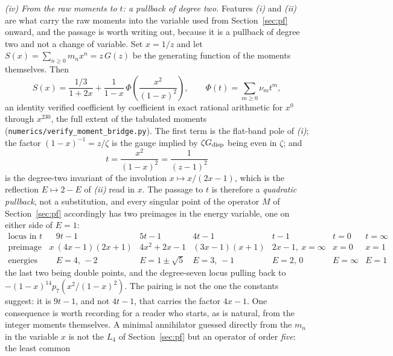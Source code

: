\documentclass[11pt]{article}
\theoremstyle{plain}
\theoremstyle{remark}
\begin{document}
\emph{(iv) From the raw moments to $t$: a pullback of degree two.} Features \emph{(i)} and \emph{(ii)} are what
carry the raw moments into the variable used from Section~\ref{sec:pf} onward, and the passage is worth writing
out, because it is a pullback of degree two and not a change of variable. Set $x=1/z$ and let
$S(x)=\sum_{n\ge0}m_nx^n=z\,G(z)$ be the generating function of the moments themselves. Then
\begin{equation}
S(x)=\frac{1/3}{1+2x}+\frac{1}{1-x}\,\Phi\!\left(\frac{x^{2}}{(1-x)^{2}}\right),
\qquad \Phi(t)=\sum_{m\ge0}\nu_m t^m,
\label{eq:momentbridge}
\end{equation}
an identity verified coefficient by coefficient in exact rational arithmetic for $x^{0}$ through $x^{230}$, the
full extent of the tabulated moments (\texttt{numerics/verify\_moment\_bridge.py}). The first term is the
flat-band pole of \emph{(i)}; the factor $(1-x)^{-1}=z/\zeta$ is the gauge implied by $\zeta G_{\rm disp}$ being
even in $\zeta$; and
\begin{equation}
t=\frac{x^{2}}{(1-x)^{2}}=\frac{1}{(z-1)^{2}}
\label{eq:tofx}
\end{equation}
is the degree-two invariant of the involution $x\mapsto x/(2x-1)$, which is the reflection $E\mapsto2-E$ of
\emph{(ii)} read in $x$. The passage to $t$ is therefore a \emph{quadratic pullback}, not a substitution, and
every singular point of the operator $M$ of Section~\ref{sec:pf} accordingly has two preimages in the energy
variable, one on either side of $E=1$:
{\small\setlength{\arraycolsep}{3pt}%
\begin{equation}
\begin{array}{c|cccccc}
\text{locus in }t & 9t-1 & 5t-1 & 4t-1 & t-1 & t=0 & t=\infty\\\hline
\text{preimage in }x & (4x-1)(2x+1) & 4x^{2}+2x-1 & (3x-1)(x+1) & 2x-1,\ x=\infty & x=0 & x=1\\
\text{energies} & E=4,\,-2 & E=1\pm\sqrt5 & E=3,\,-1 & E=2,\,0 & E=\infty & E=1
\end{array}
\label{eq:branches}
\end{equation}}%
the last two being double points, and the degree-seven locus pulling back to
$-(1-x)^{14}p_7\!\left(x^{2}/(1-x)^{2}\right)$. The pairing is not the one the constants suggest: it is $9t-1$,
and not $4t-1$, that carries the factor $4x-1$. One consequence is worth recording for a reader who starts, as
is natural, from the integer moments themselves. A minimal annihilator guessed directly from the $m_n$ in the
variable $x$ is not the $L_4$ of Section~\ref{sec:pf} but an operator of order \emph{five}: the least common
\end{document}
